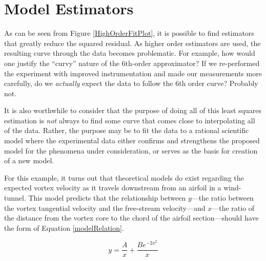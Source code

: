 \section{Model Estimators}

As can be seen from Figure \ref{HighOrderFitPlot}, it is possible to find estimators that greatly reduce the squared residual.  As higher order estimators are used, the resulting curve through the data becomes problematic.  For example, how would one justify the ``curvy'' nature of the 6th-order approximator?  If we re-performed the experiment with improved instrumentation and made our measurements more carefully, do we \emph{actually} expect the data to follow the 6th order curve?  Probably not.  

It is also worthwhile to consider that the purpose of doing all of this least squares estimation is \emph{not} always to find some curve that comes close to interpolating all of the data.  Rather, the purpose may be to fit the data to a rational scientific model where the experimental data either confirms and strengthens the proposed model for the phenomena under consideration, or serves as the basis for creation of a new model.\cite{trefethen2}

For this example, it turns out that theoretical models do exist regarding the expected vortex velocity as it travels downstream from an airfoil in a wind-tunnel.  This model predicts that the relationship between $y$---the ratio between the vortex tangential velocity and the free-stream velocity---and $x$---the ratio of the distance from the vortex core to the chord of the airfoil section---should have the form of Equation \ref{modelRelation}.

\begin{equation}
y = \frac{A}{x} + \frac{B e^{-2 x^{2}}}{x}
\label{modelRelation}
\end{equation}


